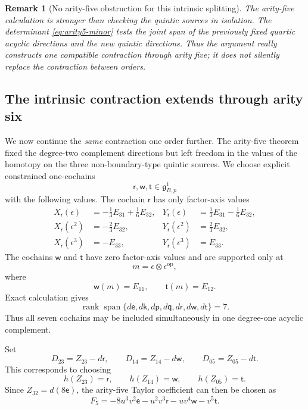 \documentclass[11pt]{amsart}
\newtheorem{remark}[theorem]{Remark}
\newcommand{\Span}{\operatorname{span}}
\newcommand{\rank}{\operatorname{rank}}
\newcommand{\ghoch}{\mathfrak g}
\begin{document}
\begin{remark}[No arity-five obstruction for this intrinsic splitting]
The arity-five calculation is stronger than checking the quintic sources in isolation.  The determinant \eqref{eq:arity5-minor} tests the \emph{joint} span of the previously fixed quartic acyclic directions and the new quintic directions.  Thus the argument really constructs one compatible contraction through arity five; it does not silently replace the contraction between orders.
\end{remark}


\subsection{The intrinsic contraction extends through arity six}\label{subsec:intrinsic-sextic}

We now continue the \emph{same} contraction one order further.  The arity-five theorem fixed the degree-two complement directions but left freedom in the values of the homotopy on the three non-boundary-type quintic sources.  We choose explicit constrained one-cochains
\[
\mathsf r,\mathsf w,\mathsf t\in\ghoch^1_{B,p}
\]
with the following values.  The cochain $\mathsf r$ has only factor-axis values
\begin{align*}
X_{\mathsf r}(\epsilon)
&=-\tfrac13E_{31}+\tfrac16E_{32},
&Y_{\mathsf r}(\epsilon)
&=\tfrac13E_{31}-\tfrac16E_{32},\\
X_{\mathsf r}(\epsilon^2)
&=-\tfrac23E_{32},
&Y_{\mathsf r}(\epsilon^2)
&=\tfrac23E_{32},\\
X_{\mathsf r}(\epsilon^3)
&=-E_{33},
&Y_{\mathsf r}(\epsilon^3)
&=E_{33}.
\end{align*}
The cochains $\mathsf w$ and $\mathsf t$ have zero factor-axis values and are supported only at
\[
m=\epsilon\otimes\epsilon^{\mathrm{op}},
\]
where
\[
\mathsf w(m)=E_{11},
\qquad
\mathsf t(m)=E_{12}.
\]
Exact calculation gives
\begin{equation}\label{eq:arity6-degree1-rank}
\rank\Span\{d\mathsf e,d\mathsf k,d\mathsf p,d\mathsf q,d\mathsf r,d\mathsf w,d\mathsf t\}=7.
\end{equation}
Thus all seven cochains may be included simultaneously in one degree-one acyclic complement.

Set
\begin{equation}\label{eq:arity6-quintic-complement}
D_{23}=Z_{23}-d\mathsf r,
\qquad
D_{14}=Z_{14}-d\mathsf w,
\qquad
D_{05}=Z_{05}-d\mathsf t.
\end{equation}
This corresponds to choosing
\[
h(Z_{23})=\mathsf r,
\qquad
h(Z_{14})=\mathsf w,
\qquad
h(Z_{05})=\mathsf t.
\]
Since $Z_{32}=d(8\mathsf e)$, the arity-five Taylor coefficient can then be chosen as
\begin{equation}\label{eq:intrinsic-F5}
F_5
=
-8u^3v^2\mathsf e
-u^2v^3\mathsf r
-uv^4\mathsf w
-v^5\mathsf t.
\end{equation}
\end{document}
